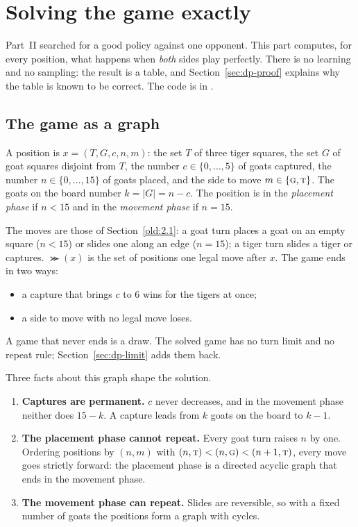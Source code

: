 \section{Solving the game exactly}\label{sec:dp}

Part~II searched for a good policy against one opponent. This part computes, for every position, what
happens when \emph{both} sides play perfectly. There is no learning and no sampling: the result is a table,
and Section~\ref{sec:dp-proof} explains why the table is known to be correct. The code is in
.

\subsection{The game as a graph}\label{sec:dp-graph}

\begin{definition}[Position]
A position is $x = (T, G, c, n, m)$: the set $T$ of three tiger squares, the set $G$ of goat squares disjoint
from $T$, the number $c \in \{0, \dots, 5\}$ of goats captured, the number $n \in \{0, \dots, 15\}$ of goats placed,
and the side to move $m \in \{\textsc{g}, \textsc{t}\}$. The goats on the board number $k = |G| = n - c$. The position is in
the \emph{placement phase} if $n < 15$ and in the \emph{movement phase} if $n = 15$.
\end{definition}

The moves are those of Section~\ref{old:2.1}: a goat turn places a goat on an empty square ($n < 15$) or slides
one along an edge ($n = 15$); a tiger turn slides a tiger or captures. $\Succ(x)$ is the set of positions one
legal move after $x$. The game ends in two ways:
\begin{itemize}
\item a capture that brings $c$ to 6 wins for the tigers at once;
\item a side to move with no legal move loses.
\end{itemize}
A game that never ends is a draw. The solved game has no turn limit and no repeat rule;
Section~\ref{sec:dp-limit} adds them back.

Three facts about this graph shape the solution.
\begin{enumerate}
\item \textbf{Captures are permanent.} $c$ never decreases, and in the movement phase neither does $15 - k$.
  A capture leads from $k$ goats on the board to $k - 1$.
\item \textbf{The placement phase cannot repeat.} Every goat turn raises $n$ by one. Ordering positions by
  $(n, m)$ with $(n, \textsc{t}) < (n, \textsc{g}) < (n + 1, \textsc{t})$, every move goes strictly forward: the placement phase is a
  directed acyclic graph that ends in the movement phase.
\item \textbf{The movement phase can repeat.} Slides are reversible, so with a fixed number of goats the
  positions form a graph with cycles.
\end{enumerate}

